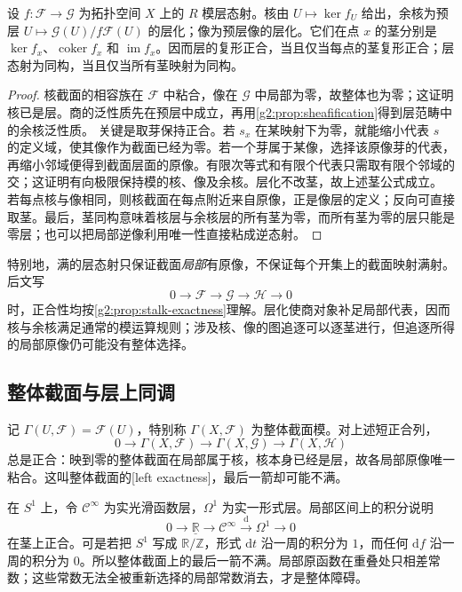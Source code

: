 \begin{proposition}\label{g2:prop:stalk-exactness}
	设 \(f:\mathcal F\to\mathcal G\) 为拓扑空间 \(X\) 上的 \(R\) 模层态射。核由 \(U\mapsto\ker f_U\) 给出，余核为预层 \(U\mapsto\mathcal G(U)/f\mathcal F(U)\) 的层化；像为预层像的层化。它们在点 \(x\) 的茎分别是 \(\ker f_x\)、\(\operatorname{coker}f_x\) 和 \(\operatorname{im}f_x\)。因而层的复形正合，当且仅当每点的茎复形正合；层态射为同构，当且仅当所有茎映射为同构。
\end{proposition}
\begin{proof}
	核截面的相容族在 \(\mathcal F\) 中粘合，像在 \(\mathcal G\) 中局部为零，故整体也为零；这证明核已是层。商的泛性质先在预层中成立，再用\cref{g2:prop:sheafification}得到层范畴中的余核泛性质。
	关键是取芽保持正合。若 \(s_x\) 在某映射下为零，就能缩小代表 \(s\) 的定义域，使其像作为截面已经为零。若一个芽属于某像，选择该原像芽的代表，再缩小邻域便得到截面层面的原像。有限次等式和有限个代表只需取有限个邻域的交；这证明有向极限保持模的核、像及余核。层化不改茎，故上述茎公式成立。
	若每点核与像相同，则核截面在每点附近来自原像，正是像层的定义；反向可直接取茎。最后，茎同构意味着核层与余核层的所有茎为零，而所有茎为零的层只能是零层；也可以把局部逆像利用唯一性直接粘成逆态射。
\end{proof}

特别地，满的层态射只保证截面\emph{局部}有原像，不保证每个开集上的截面映射满射。后文写
\[
	0\longrightarrow\mathcal F\longrightarrow\mathcal G\longrightarrow\mathcal H\longrightarrow0
\]
时，正合性均按\cref{g2:prop:stalk-exactness}理解。层化使商对象补足局部代表，因而核与余核满足通常的模运算规则；涉及核、像的图追逐可以逐茎进行，但追逐所得的局部原像仍可能没有整体选择。

\subsection{整体截面与层上同调}
\label{g2:subsec:0701:03}
记 \(\Gamma(U,\mathcal F)=\mathcal F(U)\)，特别称 \(\Gamma(X,\mathcal F)\) 为整体截面模。对上述短正合列，
\[
	0\longrightarrow\Gamma(X,\mathcal F)\longrightarrow\Gamma(X,\mathcal G)\longrightarrow\Gamma(X,\mathcal H)
\]
总是正合：映到零的整体截面在局部属于核，核本身已经是层，故各局部原像唯一粘合。这叫整体截面的[left exactness]，最后一箭却可能不满。

\begin{example}\label{g2:exm:sheaf-antiderivative-obstruction}
	在 \(S^1\) 上，令 \(\mathcal C^{\infty}\) 为实光滑函数层，\(\Omega^1\) 为实一形式层。局部区间上的积分说明
	\[
		0\longrightarrow\underline{\mathbb R}\longrightarrow\mathcal C^{\infty}\xrightarrow{\mathrm d}\Omega^1\longrightarrow0
	\]
	在茎上正合。可是若把 \(S^1\) 写成 \(\mathbb R/\mathbb Z\)，形式 \(\mathrm dt\) 沿一周的积分为 \(1\)，而任何 \(\mathrm df\) 沿一周的积分为 \(0\)。所以整体截面上的最后一箭不满。局部原函数在重叠处只相差常数；这些常数无法全被重新选择的局部常数消去，才是整体障碍。
\end{example}

